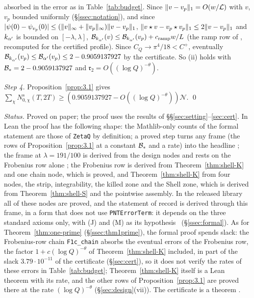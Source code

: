 absorbed in the error as in Table~\ref{tab:budget}. Since $\lVert v-v_p\rVert_1=O(w/\mathcal L)$ with $v$, $v_p$ bounded uniformly (\S\ref{ssec:notation}), and since
$\lvert \psi(0)-\psi_{v_p}(0)\rvert\le(\lVert v\rVert_\infty+\lVert v_p\rVert_\infty)\lVert v-v_p\rVert_1$, $\lVert v\star v-v_p\star v_p\rVert_1\le2\lVert v-v_p\rVert_1$ and $k_{\alpha'}$ is bounded
on $[-\lambda,\lambda]$, $\mathcal B_{k_{\alpha'}}(v)\le\mathcal B_{k_{\alpha'}}(v_p)+c_{\rm ramp}w/L$ (the ramp row of
\cite{DSouza}, recomputed for the certified profile). Since $C_Q\to\pi^4/18<C^+$, eventually $\mathcal B_{k_{\alpha'}}(v_p)\le\mathcal B_{\alpha'}(v_p)\le2-0.9059137927$ by the
certificate. So (ii) holds with $\mathcal B_*=2-0.9059137927$ and $\mathfrak r_2=O((\log Q)^{-\theta})$.

\emph{Step 4.} Proposition~\ref{prop:3.1} gives
$\sum_\chi N^s_{0,\chi}(T,2T)\ge(0.9059137927-O((\log Q)^{-\theta}))\mathcal N$. \qed

\emph{Status.} Proved on paper; the proof uses the results of \S\S\ref{sec:setting}--\ref{sec:cert}. In Lean the proof has the following shape: the Mathlib-only counts of the formal statement are those of \texttt{ZetaQ} by definition;
a proved step turns any frame (the rows of Proposition~\ref{prop:3.1} at a constant $\mathcal B_*$ and a rate) into the headline \tagL; the frame at $\lambda=191/100$ is
derived from the design nodes and rests on the Frobenius row alone \tagLm; the Frobenius row is derived from Theorem~\ref{thm:shell-K} and one chain node, which is proved, and
Theorem~\ref{thm:shell-K} from four nodes, the strip, integrability, the killed zone and the Shell zone, which is derived from Theorem~\ref{thm:shell-S}
and the pointwise assembly. In the released library all of these nodes are proved, and the statement of record is derived through this frame, in a
form that does not use \texttt{PNTErrorTerm}: it depends on the three standard axioms only, with (J) and (M) as its hypothesis \tagL\
(\S\ref{ssec:formal}). As for Theorem~\ref{thm:one-prime} (\S\ref{ssec:thm1prime}), the formal proof spends slack: the Frobenius-row chain
\texttt{F1c\_chain} absorbs the eventual errors of the Frobenius row, the factor $1+c(\log Q)^{-\theta}$ of Theorem~\ref{thm:shell-K} included, in part
of the slack $3.79\cdot10^{-11}$ of the certificate (\S\ref{sec:cert}), so it does not verify the rates of these errors in Table~\ref{tab:budget};
Theorem~\ref{thm:shell-K} itself is a Lean theorem with its rate, and the other rows of Proposition~\ref{prop:3.1} are proved there at the rate
$(\log Q)^{-\theta}$ (\S\ref{sec:design}(vii)). The
certificate is a theorem \tagL.
